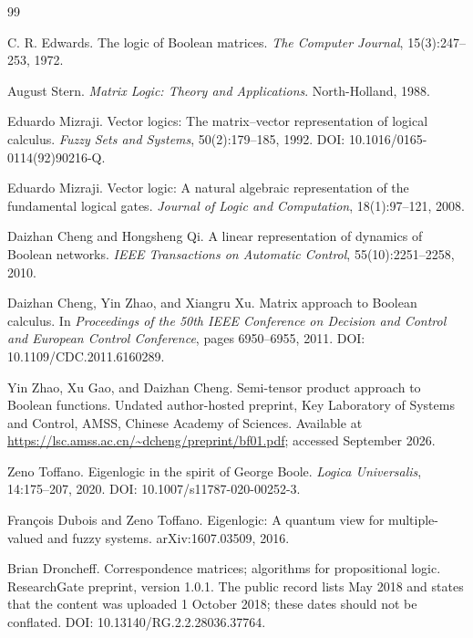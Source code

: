 \documentclass[11pt]{article}
\theoremstyle{definition}
\theoremstyle{remark}
\begin{document}
\begin{thebibliography}{99}

C. R. Edwards.
\newblock The logic of Boolean matrices.
\newblock \emph{The Computer Journal}, 15(3):247--253, 1972.

August Stern.
\newblock \emph{Matrix Logic: Theory and Applications}.
\newblock North-Holland, 1988.

Eduardo Mizraji.
\newblock Vector logics: The matrix--vector representation of logical calculus.
\newblock \emph{Fuzzy Sets and Systems}, 50(2):179--185, 1992.
\newblock DOI: 10.1016/0165-0114(92)90216-Q.

Eduardo Mizraji.
\newblock Vector logic: A natural algebraic representation of the fundamental logical gates.
\newblock \emph{Journal of Logic and Computation}, 18(1):97--121, 2008.

Daizhan Cheng and Hongsheng Qi.
\newblock A linear representation of dynamics of Boolean networks.
\newblock \emph{IEEE Transactions on Automatic Control}, 55(10):2251--2258, 2010.

Daizhan Cheng, Yin Zhao, and Xiangru Xu.
\newblock Matrix approach to Boolean calculus.
\newblock In \emph{Proceedings of the 50th IEEE Conference on Decision and Control and European Control Conference}, pages 6950--6955, 2011.
\newblock DOI: 10.1109/CDC.2011.6160289.

Yin Zhao, Xu Gao, and Daizhan Cheng.
\newblock Semi-tensor product approach to Boolean functions.
\newblock Undated author-hosted preprint, Key Laboratory of Systems and Control, AMSS, Chinese Academy of Sciences.
\newblock Available at \url{https://lsc.amss.ac.cn/~dcheng/preprint/bf01.pdf}; accessed September 2026.

Zeno Toffano.
\newblock Eigenlogic in the spirit of George Boole.
\newblock \emph{Logica Universalis}, 14:175--207, 2020.
\newblock DOI: 10.1007/s11787-020-00252-3.

Fran\c{c}ois Dubois and Zeno Toffano.
\newblock Eigenlogic: A quantum view for multiple-valued and fuzzy systems.
\newblock arXiv:1607.03509, 2016.

Brian Droncheff.
\newblock Correspondence matrices; algorithms for propositional logic.
\newblock ResearchGate preprint, version 1.0.1.  The public record lists May 2018 and states that the content was uploaded 1 October 2018; these dates should not be conflated.
\newblock DOI: 10.13140/RG.2.2.28036.37764.


\end{thebibliography}
\end{document}
